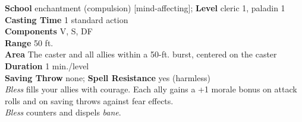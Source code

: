 \textbf{School} enchantment (compulsion) [mind-affecting]; \textbf{Level} cleric 1, paladin 1\\
\textbf{Casting Time} 1 standard action\\
\textbf{Components} V, S, DF\\
\textbf{Range} 50 ft.\\
\textbf{Area} The caster and all allies within a 50-ft. burst, centered on the caster\\
\textbf{Duration} 1 min./level\\
\textbf{Saving Throw} none; \textbf{Spell Resistance} yes (harmless)\\
\textit{Bless }fills your allies with courage. Each ally gains a +1 morale bonus on attack rolls and on saving throws against fear effects.\\
\textit{Bless }counters and dispels \textit{bane}.\\
